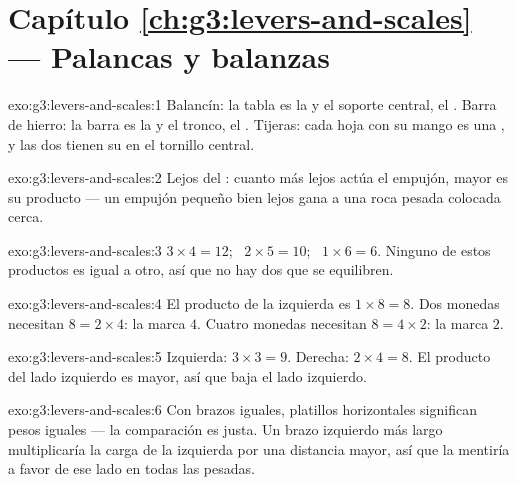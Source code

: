 \section*{Capítulo \ref{ch:g3:levers-and-scales} --- Palancas y balanzas}

\begin{solution}{exo:g3:levers-and-scales:1}
Balancín: la tabla es la  y el soporte central, el
. Barra de hierro: la barra es la  y el
tronco, el . Tijeras: cada hoja con su mango es una
, y las dos tienen su  en el tornillo
central.
\end{solution}

\begin{solution}{exo:g3:levers-and-scales:2}
Lejos del : cuanto más lejos actúa el empujón, mayor es
su producto --- un empujón pequeño bien lejos gana a una roca pesada
colocada cerca.
\end{solution}

\begin{solution}{exo:g3:levers-and-scales:3}
$3 \times 4 = 12$; \ $2 \times 5 = 10$; \ $1 \times 6 = 6$. Ninguno de
estos productos es igual a otro, así que no hay dos que se
equilibren.
\end{solution}

\begin{solution}{exo:g3:levers-and-scales:4}
El producto de la izquierda es $1 \times 8 = 8$. Dos monedas
necesitan $8 = 2 \times 4$: la marca $4$. Cuatro monedas necesitan
$8 = 4 \times 2$: la marca $2$.
\end{solution}

\begin{solution}{exo:g3:levers-and-scales:5}
Izquierda: $3 \times 3 = 9$. Derecha: $2 \times 4 = 8$. El producto
del lado izquierdo es mayor, así que baja el lado izquierdo.
\end{solution}

\begin{solution}{exo:g3:levers-and-scales:6}
Con brazos iguales, platillos horizontales significan pesos iguales
--- la comparación es justa. Un brazo izquierdo más largo
multiplicaría la carga de la izquierda por una distancia mayor, así
que la  mentiría a favor de ese lado en todas las pesadas.
\end{solution}

